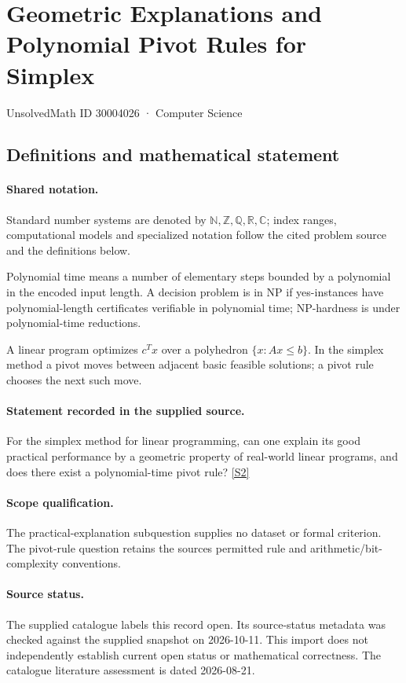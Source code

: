 \documentclass[11pt]{article}
\newcommand{\sref}[2]{\hyperlink{source:#1:#2}{[S#2]}}
\begin{document}
\setcounter{section}{30004025}
\section{Geometric Explanations and Polynomial Pivot Rules for Simplex}\label{30004026}
{\small\sffamily UnsolvedMath ID 30004026 · Computer Science}
\subsection{Definitions and mathematical statement}

\paragraph{Shared notation.}Standard number systems are denoted by $\mathbb N,\mathbb Z,\mathbb Q,\mathbb R,\mathbb C$; index ranges, computational models and specialized notation follow the cited problem source and the definitions below.


Polynomial time means a number of elementary steps bounded by a polynomial in the encoded input length. A decision problem is in $\mathrm{NP}$ if yes-instances have polynomial-length certificates verifiable in polynomial time; NP-hardness is under polynomial-time reductions.

A linear program optimizes $c^Tx$ over a polyhedron $\{x:Ax\leq b\}$. In the simplex method a pivot moves between adjacent basic feasible solutions; a pivot rule chooses the next such move.
\paragraph{Statement recorded in the supplied source.}
For the simplex method for linear programming, can one explain its good practical performance by a geometric property of real-world linear programs, and does there exist a polynomial-time pivot rule? \sref{30004026}{2}
\paragraph{Scope qualification.}
The practical-explanation subquestion supplies no dataset or formal criterion. The pivot-rule question retains the source\textquotesingle s permitted rule and arithmetic/bit-complexity conventions.
\paragraph{Source status.}
The supplied catalogue labels this record open. Its source-status metadata was checked against the supplied snapshot on 2026-10-11. This import does not independently establish current open status or mathematical correctness. The catalogue literature assessment is dated 2026-08-21.
\end{document}
